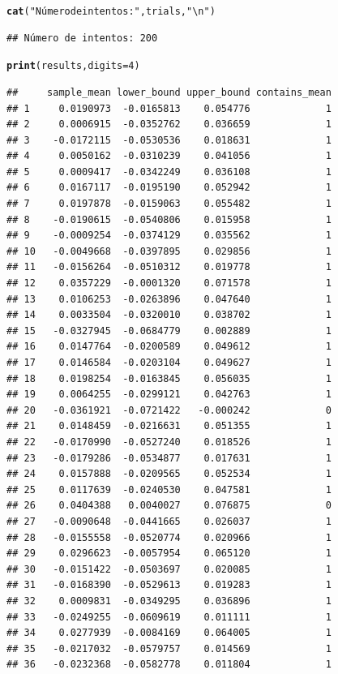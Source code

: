 \documentclass[12pt]{article}\usepackage[]{graphicx}\usepackage[]{xcolor}
\makeatletter
\newcommand{\hlnum}[1]{\textcolor[rgb]{0.686,0.059,0.569}{#1}}%
\newcommand{\hlsng}[1]{\textcolor[rgb]{0.192,0.494,0.8}{#1}}%
\newcommand{\hldef}[1]{\textcolor[rgb]{0.345,0.345,0.345}{#1}}%
\newcommand{\hlkwc}[1]{\textcolor[rgb]{0.333,0.667,0.333}{#1}}%
\newcommand{\hlkwd}[1]{\textcolor[rgb]{0.737,0.353,0.396}{\textbf{#1}}}%
\newenvironment{kframe}{%
 \def\at@end@of@kframe{}%
 \ifinner\ifhmode%
  \def\at@end@of@kframe{\end{minipage}}%
  \begin{minipage}{\columnwidth}%
 \fi\fi%
 \def\FrameCommand##1{\hskip\@totalleftmargin \hskip-\fboxsep
 \colorbox{shadecolor}{##1}\hskip-\fboxsep
     \hskip-\linewidth \hskip-\@totalleftmargin \hskip\columnwidth}%
 \MakeFramed {\advance\hsize-\width
   \@totalleftmargin\z@ \linewidth\hsize
   \@setminipage}}%
 {\par\unskip\endMakeFramed%
 \at@end@of@kframe}
\newenvironment{knitrout}{}{} %
\makeatother
\begin{document}
\begin{knitrout}
\begin{kframe}
\begin{alltt}
\hlkwd{cat}\hldef{(}\hlsng{"Número de intentos:"}\hldef{, trials,} \hlsng{"\textbackslash{}n"}\hldef{)}
\end{alltt}
\begin{verbatim}
## Número de intentos: 200
\end{verbatim}
\begin{alltt}
\hlkwd{print}\hldef{(results,} \hlkwc{digits}\hldef{=} \hlnum{4}\hldef{)}
\end{alltt}
\begin{verbatim}
##     sample_mean lower_bound upper_bound contains_mean
## 1     0.0190973  -0.0165813    0.054776             1
## 2     0.0006915  -0.0352762    0.036659             1
## 3    -0.0172115  -0.0530536    0.018631             1
## 4     0.0050162  -0.0310239    0.041056             1
## 5     0.0009417  -0.0342249    0.036108             1
## 6     0.0167117  -0.0195190    0.052942             1
## 7     0.0197878  -0.0159063    0.055482             1
## 8    -0.0190615  -0.0540806    0.015958             1
## 9    -0.0009254  -0.0374129    0.035562             1
## 10   -0.0049668  -0.0397895    0.029856             1
## 11   -0.0156264  -0.0510312    0.019778             1
## 12    0.0357229  -0.0001320    0.071578             1
## 13    0.0106253  -0.0263896    0.047640             1
## 14    0.0033504  -0.0320010    0.038702             1
## 15   -0.0327945  -0.0684779    0.002889             1
## 16    0.0147764  -0.0200589    0.049612             1
## 17    0.0146584  -0.0203104    0.049627             1
## 18    0.0198254  -0.0163845    0.056035             1
## 19    0.0064255  -0.0299121    0.042763             1
## 20   -0.0361921  -0.0721422   -0.000242             0
## 21    0.0148459  -0.0216631    0.051355             1
## 22   -0.0170990  -0.0527240    0.018526             1
## 23   -0.0179286  -0.0534877    0.017631             1
## 24    0.0157888  -0.0209565    0.052534             1
## 25    0.0117639  -0.0240530    0.047581             1
## 26    0.0404388   0.0040027    0.076875             0
## 27   -0.0090648  -0.0441665    0.026037             1
## 28   -0.0155558  -0.0520774    0.020966             1
## 29    0.0296623  -0.0057954    0.065120             1
## 30   -0.0151422  -0.0503697    0.020085             1
## 31   -0.0168390  -0.0529613    0.019283             1
## 32    0.0009831  -0.0349295    0.036896             1
## 33   -0.0249255  -0.0609619    0.011111             1
## 34    0.0277939  -0.0084169    0.064005             1
## 35   -0.0217032  -0.0579757    0.014569             1
## 36   -0.0232368  -0.0582778    0.011804             1

\end{verbatim}
\end{kframe}
\end{knitrout}
\end{document}
